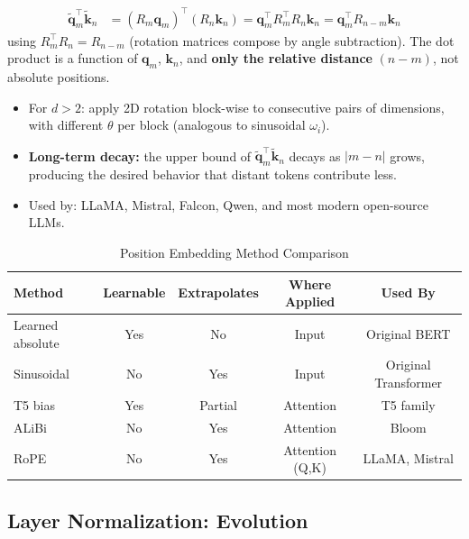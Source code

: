 \documentclass[11pt, a4paper]{article}
\begin{document}
\begin{mathbox}
\begin{align}
\tilde{\mathbf{q}}_m^\top \tilde{\mathbf{k}}_n &= (R_m \mathbf{q}_m)^\top (R_n \mathbf{k}_n) = \mathbf{q}_m^\top R_m^\top R_n \mathbf{k}_n = \mathbf{q}_m^\top R_{n-m} \mathbf{k}_n
\end{align}
using $R_m^\top R_n = R_{n-m}$ (rotation matrices compose by angle subtraction). The dot product is a function of $\mathbf{q}_m$, $\mathbf{k}_n$, and \textbf{only the relative distance} $(n - m)$, not absolute positions.
\end{mathbox}

\begin{itemize}[leftmargin=2em]
  \item For $d > 2$: apply 2D rotation block-wise to consecutive pairs of dimensions, with different $\theta$ per block (analogous to sinusoidal $\omega_i$).
  \item \textbf{Long-term decay:} the upper bound of $\tilde{\mathbf{q}}_m^\top \tilde{\mathbf{k}}_n$ decays as $|m - n|$ grows, producing the desired behavior that distant tokens contribute less.
  \item Used by: LLaMA, Mistral, Falcon, Qwen, and most modern open-source LLMs.
\end{itemize}

\begin{table}[h]
\centering
\caption{Position Embedding Method Comparison}
\begin{tabular}{@{}lcccc@{}}
\toprule
\textbf{Method} & \textbf{Learnable} & \textbf{Extrapolates} & \textbf{Where Applied} & \textbf{Used By} \\
\midrule
Learned absolute & Yes & No & Input & Original BERT \\
Sinusoidal & No & Yes & Input & Original Transformer \\
T5 bias & Yes & Partial & Attention & T5 family \\
ALiBi & No & Yes & Attention & Bloom \\
RoPE & No & Yes & Attention (Q,K) & LLaMA, Mistral \\
\bottomrule
\end{tabular}
\end{table}

\subsection{Layer Normalization: Evolution}
\end{document}
